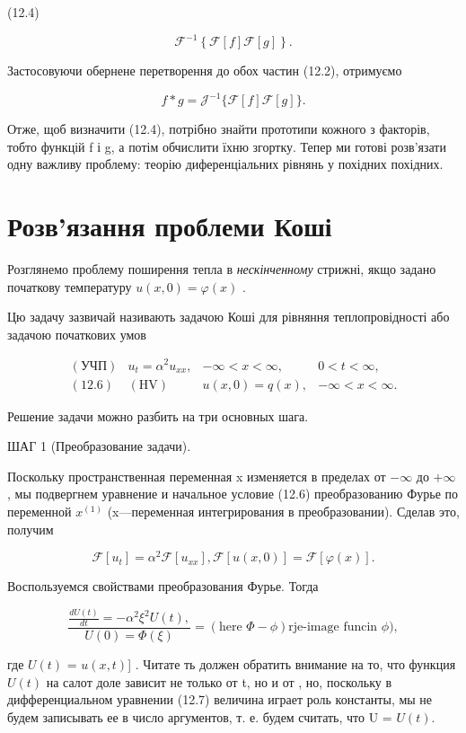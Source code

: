 \documentclass[
  ukrainian,
]{article}
\begin{document}
(12.4)

\[
\mathcal{F}^{-1}\left\{\mathcal{F}\left[f\right]\mathcal{F}\left[g\right]\right\}.
\]

Застосовуючи обернене перетворення до обох частин (12.2), отримуємо

\[
f * g = \mathcal{J}^{-1} \{ \mathcal{F} [f] \mathcal{F} [g] \}.
\]

Отже, щоб визначити (12.4), потрібно знайти прототипи кожного з
факторів, тобто функцій f і g, а потім обчислити їхню згортку. Тепер ми
готові розв'язати одну важливу проблему: теорію диференціальних рівнянь
у похідних похідних.

\section{Розв'язання проблеми
Коші}\label{ux440ux43eux437ux432ux44fux437ux430ux43dux43dux44f-ux43fux440ux43eux431ux43bux435ux43cux438-ux43aux43eux448ux456}

Розглянемо проблему поширення тепла в \emph{нескінченному} стрижні, якщо
задано початкову температуру \(u(x, 0) = \varphi(x)\) .

Цю задачу зазвичай називають задачою Коші для рівняння теплопровідності
або задачою початкових умов

\[
\begin{aligned} (\text{УЧП}) & u_t = \alpha^2 u_{xx}, & -\infty < x < \infty, & 0 < t < \infty, \\ (\text{12.6}) & (\text{HV}) & u(x,0) = q(x), & -\infty < x < \infty. \end{aligned}
\]

Решение задачи можно разбить на три основных шага.

ШАГ 1 (Преобразование задачи).

Поскольку пространственная переменная x изменяется в пределах от
\(-\infty\) до \(+\infty\) , мы подвергнем уравнение и начальное условие
(12.6) преобразованию Фурье по переменной \(x^{(1)}\) (x---переменная
интегрирования в преобразовании). Сделав это, получим

\[
\mathcal{F}[u_t] = \alpha^2 \mathcal{F}[u_{xx}],
\mathcal{F}[u(x, 0)] = \mathcal{F}[\varphi(x)].
\]

Воспользуемся свойствами преобразования Фурье. Тогда

\[
\frac{\frac{dU(t)}{dt} = -\alpha^2 \xi^2 U(t), }{U(0) = \Phi(\xi)} = (\text{here } \Phi - \phi) \text{rje-image funcin } \phi),
\]

где \(U(t)\) = \mathcal{F}{[}\(u(x, t)\){]} . Читате ть должен обратить
внимание на то, что функция \(U(t)\) на салот доле зависит не только от
t, но и от \xi , но, поскольку в дифференциальном уравнении (12.7)
величина \xi  играет роль константы, мы не будем записывать ее в число
аргументов, т. е. будем считать, что U = \(U(t)\).
\end{document}
